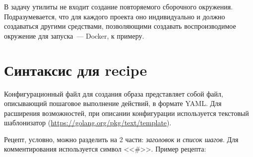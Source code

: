 \documentclass[10pt, a5paper]{article}
\begin{document}
В задачу утилиты не входит создание повторяемого сборочного окружения. Подразумевается, что для каждого проекта оно индивидуально и должно создаваться другими средствами, позволяющими создавать воспроизводимое окружение для запуска~--- Docker, к примеру.

\section*{Синтаксис для recipe}

Конфигурационный файл для создания образа представляет собой файл, описывающий пошаговое выполнение действий, в формате YAML. Для расширения возможностей, при описании конфигурации используется текстовый шаблонизатор (\url{https://golang.org/pkg/text/template}).

Рецепт, условно, можно разделить на 2 части: \textit{заголовок} и \textit{список шагов}.
Для комментирования используется символ <<\#>>. Пример рецепта:
\end{document}
